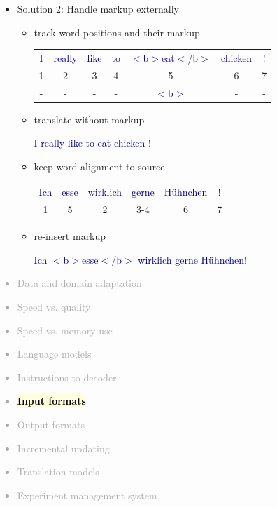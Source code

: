 \documentclass[landscape]{uedslides2C}
\newcommand{\example}[1]{\textcolor{darkblue}{\rm #1}}
\newcommand{\currenttopic}[1]{\colorbox{lightyellow}{\textcolor{black}{\bf #1}}}
\begin{document}
\begin{itemize}
\item Solution 2: Handle markup externally
\begin{itemize} \itemsep 5mm
\item track word positions and their markup
\begin{center}
\begin{tabular}{ccccccc}
\example{I} & \example{really} & \example{like} & \example{to} & \example{$<$b$>$eat$<$/b$>$} & \example{chicken} & \example{!} \\
1 & 2 & 3 & 4 & 5 & 6 & 7\\
-&-&-&-&\example{$<$b$>$}&-&-\\
\end{tabular}
\end{center}

\item translate without markup
\begin{center}
\example{I really like to eat chicken !}
\end{center}

\item keep word alignment to source
\begin{center}
\begin{tabular}{cccccc}
\example{Ich} & \example{esse} & \example{wirklich} & \example{gerne} & \example{H{\"u}hnchen} & \example{!} \\
1 & 5 & 2 & 3-4 & 6 & 7\\
\end{tabular}
\end{center}

\item re-insert markup
\begin{center}
\example{Ich $<$b$>$esse$<$/b$>$ wirklich gerne H{\"u}hnchen!}
\end{center}

\end{itemize}
\end{itemize}


\vspace{-5mm}
\textcolor{darkgrey}{
\begin{itemize} \itemsep -1mm
\item Data and domain adaptation
\item Speed vs. quality
\item Speed vs. memory use
\item Language models
\item Instructions to decoder
\item \currenttopic{Input formats}
\item Output formats
\item Incremental updating
\item Translation models
\item Experiment management system
\end{itemize}
}
\end{document}
